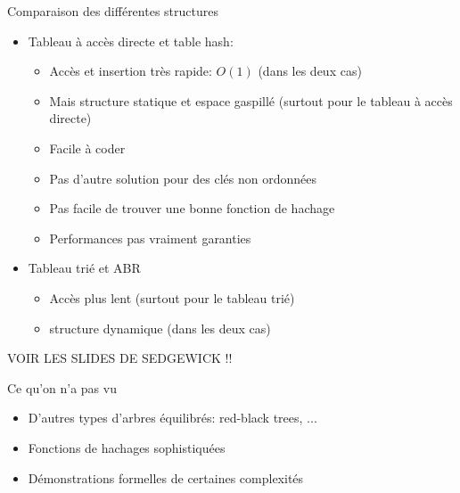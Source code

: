 \begin{frame}{Comparaison des différentes structures}
\begin{itemize}
\item Tableau à accès directe et table hash:
\begin{itemize}
\item Accès et insertion très rapide: $O(1)$ (dans les deux cas)
\item Mais structure statique et espace gaspillé (surtout pour le tableau à accès directe)
\item Facile à coder
\item Pas d'autre solution pour des clés non ordonnées
\item Pas facile de trouver une bonne fonction de hachage
\item Performances pas vraiment garanties
\end{itemize}
\item Tableau trié et ABR
\begin{itemize}
\item Accès plus lent (surtout pour le tableau trié)
\item structure dynamique (dans les deux cas)
\end{itemize}
\end{itemize}
VOIR LES SLIDES DE SEDGEWICK !!
\end{frame}

\begin{frame}{Ce qu'on n'a pas vu}

\begin{itemize}
\item D'autres types d'arbres équilibrés: red-black trees, ...
\item Fonctions de hachages sophistiquées
\item Démonstrations formelles de certaines complexités
\end{itemize}

\end{frame}
